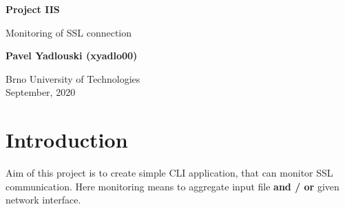 \documentclass[12pt,a4paper]{article}
\begin{document}
    \begin{titlepage}
        \begin{center}
            \vspace*{1cm}
    
            \Large{\textbf{Project IIS}}
    
            \vspace{0.5cm}
            Monitoring of SSL connection
                
            \vspace{1.5cm}
            
            \textbf{Pavel Yadlouski (xyadlo00)}
    
            \vfill
                
            \vspace{0.8cm}
        
            Brno University of Technologies\\
            September, 2020
                
        \end{center}
    \end{titlepage}
    
    \tableofcontents
    \newpage

    \section{Introduction}
    Aim of this project is to create simple CLI application, that can monitor SSL communication.
    Here monitoring means to aggregate input file \textbf{and / or} given network interface.  
        
\end{document}
